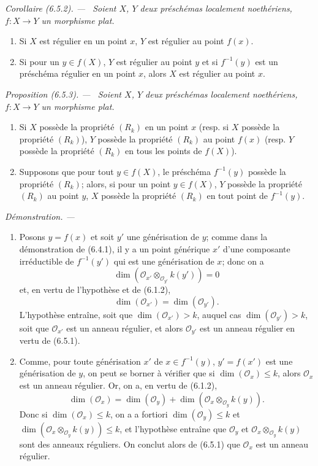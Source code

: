 \documentclass[10pt,oneside]{book}
\newenvironment{proposition}[1][]{%
  \par\medskip\noindent\itshape Proposition (#1). ---\ }{\par}
\newenvironment{corollary}[1][]{%
  \par\medskip\noindent\itshape Corollaire (#1). ---\ }{\par}
\newenvironment{proof}{%
  \par\medskip\noindent\textit{Démonstration. ---\ }}{\par}
\begin{document}
\begin{corollary}[6.5.2]
\label{IV.2.s6.5.2-fr}
Soient $X$, $Y$ deux préschémas localement noethériens, $f:X\to Y$
un morphisme plat.
\begin{enumerate}
\item[(i)] Si $X$ est régulier en un point $x$, $Y$ est régulier au point
$f(x)$.
\item[(ii)] Si pour un $y\in f(X)$, $Y$ est régulier au point $y$ et si
$f^{-1}(y)$ est un préschéma régulier en un point $x$, alors $X$ est
régulier au point $x$.
\end{enumerate}
\end{corollary}

\begin{proposition}[6.5.3]
\label{IV.2.s6.5.3-fr}
Soient $X$, $Y$ deux préschémas localement noethériens, $f:X\to Y$
un morphisme plat.
\begin{enumerate}
\item[(i)] Si $X$ possède la propriété $(R_k)$ en un point $x$
(resp. si $X$ possède la propriété $(R_k)$), $Y$ possède la propriété
$(R_k)$ au point $f(x)$ (resp. $Y$ possède la propriété $(R_k)$ en tous
les points de $f(X)$).
\item[(ii)] Supposons que pour tout $y\in f(X)$, le préschéma
$f^{-1}(y)$ possède la propriété $(R_k)$; alors, si pour un point
$y\in f(X)$, $Y$ possède la propriété $(R_k)$ au point $y$, $X$ possède
la propriété $(R_k)$ en tout point de $f^{-1}(y)$.
\end{enumerate}
\end{proposition}

\begin{proof}
\medskip\noindent
\begin{enumerate}
\item[(i)] Posons $y=f(x)$ et soit $y'$ une générisation de $y$; comme
dans la démonstration de (6.4.1), il y a un point générique $x'$ d'une
composante irréductible de $f^{-1}(y')$ qui est une générisation de $x$;
donc on a
\[
\dim(\mathcal O_{x'}\otimes_{\mathcal O_{y'}}k(y'))=0
\]
et, en vertu de l'hypothèse et de (6.1.2),
\[
\dim(\mathcal O_{x'})=\dim(\mathcal O_{y'}).
\]
L'hypothèse entraîne, soit que
$\dim(\mathcal O_{x'})>k$, auquel cas
$\dim(\mathcal O_{y'})>k$, soit que $\mathcal O_{x'}$ est un anneau
régulier, et alors $\mathcal O_{y'}$ est un anneau régulier en vertu de
(6.5.1).

\item[(ii)] Comme, pour toute générisation $x'$ de $x\in f^{-1}(y)$,
$y'=f(x')$ est une générisation de $y$, on peut se borner à vérifier que
si $\dim(\mathcal O_x)\leqslant k$, alors $\mathcal O_x$ est un anneau
régulier. Or, on a, en vertu de (6.1.2),
\[
\dim(\mathcal O_x)=\dim(\mathcal O_y)
+\dim(\mathcal O_x\otimes_{\mathcal O_y}k(y)).
\]
Donc si $\dim(\mathcal O_x)\leqslant k$, on a a fortiori
$\dim(\mathcal O_y)\leqslant k$ et
$\dim(\mathcal O_x\otimes_{\mathcal O_y}k(y))\leqslant k$, et l'hypothèse
entraîne que $\mathcal O_y$ et
$\mathcal O_x\otimes_{\mathcal O_y}k(y)$ sont des anneaux réguliers. On
conclut alors de (6.5.1) que $\mathcal O_x$ est un anneau régulier.
\end{enumerate}
\end{proof}
\end{document}
